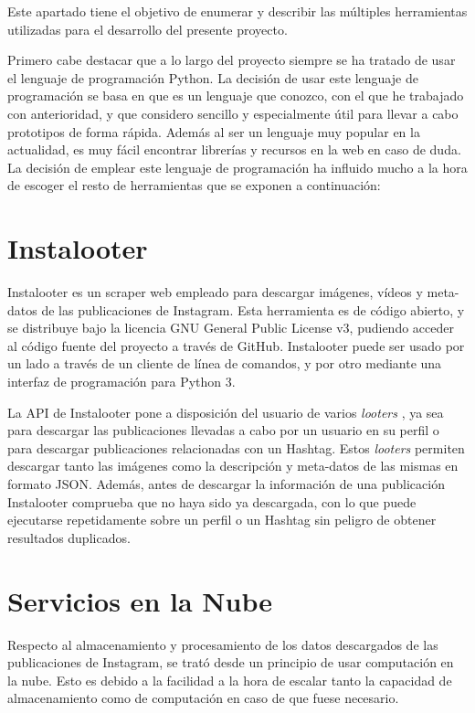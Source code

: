 
Este apartado tiene el objetivo de enumerar y describir las múltiples herramientas utilizadas para el desarrollo del presente proyecto.

Primero cabe destacar que a lo largo del proyecto siempre se ha tratado de usar el lenguaje de programación Python. La decisión de usar este lenguaje de programación se basa en que es un lenguaje que conozco, con el que he trabajado con anterioridad, y que considero sencillo y especialmente útil para llevar a cabo prototipos de forma rápida. Además al ser un lenguaje muy popular en la actualidad, es muy fácil encontrar librerías y recursos en la web en caso de duda. La decisión de emplear este lenguaje de programación ha influido mucho a la hora de escoger el resto de herramientas que se exponen a continuación:

\section{Instalooter}
\label{sect:instalooter}

Instalooter es un scraper web empleado para descargar imágenes, vídeos y meta-datos de las publicaciones de Instagram. Esta herramienta es de código abierto, y se distribuye bajo la licencia GNU General Public License v3, pudiendo acceder al código fuente del proyecto a través de GitHub. Instalooter puede ser usado por un lado a través de un cliente de línea de comandos, y por otro mediante una interfaz de programación para Python 3.

La API de Instalooter pone a disposición del usuario de varios \textit{looters} \cite{instalooter_api}, ya sea para descargar las publicaciones llevadas a cabo por un usuario en su perfil o para descargar publicaciones relacionadas con un Hashtag. Estos \textit{looters} permiten descargar tanto las imágenes como la descripción y meta-datos de las mismas en formato JSON. Además, antes de descargar la información de una publicación Instalooter comprueba que no haya sido ya descargada, con lo que puede ejecutarse repetidamente sobre un perfil o un Hashtag sin peligro de obtener resultados duplicados.

\section{Servicios en la Nube}

Respecto al almacenamiento y procesamiento de los datos descargados de las publicaciones de Instagram, se trató desde un principio de usar computación en la nube. Esto es debido a la facilidad a la hora de escalar tanto la capacidad de almacenamiento como de computación en caso de que fuese necesario.

